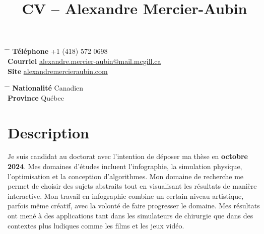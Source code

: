 \documentclass[10pt]{article} %
\begin{document}

\title{CV -- Alexandre Mercier-Aubin} %


\parbox{0.5\textwidth}{ %
\begin{tabbing} %
\hspace{3cm} \= \hspace{4cm} \= \kill %
{\bf Téléphone} \> +1 (418) 572 0698 \\ %
{\bf Courriel} \> \href{mailto:alexandre.mercier-aubin@mail.mcgill.ca}{alexandre.mercier-aubin@mail.mcgill.ca} \\ %
{\bf Site} \> \href{https://alexandremercieraubin.com}{alexandremercieraubin.com} \\
\end{tabbing}}
\hfill %
\parbox{0.5\textwidth}{ %
\begin{tabbing} %
\hspace{3cm} \= \hspace{4cm} \= \kill %
{\bf Nationalité} \> Canadien \\ %
{\bf Province} \> {Québec}\\
\end{tabbing}}

\vspace{-0.7cm} 

\justifying

\section{Description}

Je suis candidat au doctorat avec l'intention de déposer ma thèse en \textbf{octobre 2024}. Mes domaines d'études incluent l'infographie, la simulation physique, l'optimisation et la conception d'algorithmes. Mon domaine de recherche me permet de choisir des sujets abstraits tout en visualisant les résultats de manière interactive. Mon travail en infographie combine un certain niveau artistique, parfois même créatif, avec la volonté de faire progresser le domaine. Mes résultats ont mené à des applications tant dans les simulateurs de chirurgie que dans des contextes plus ludiques comme les films et les jeux vidéo.
\end{document}
